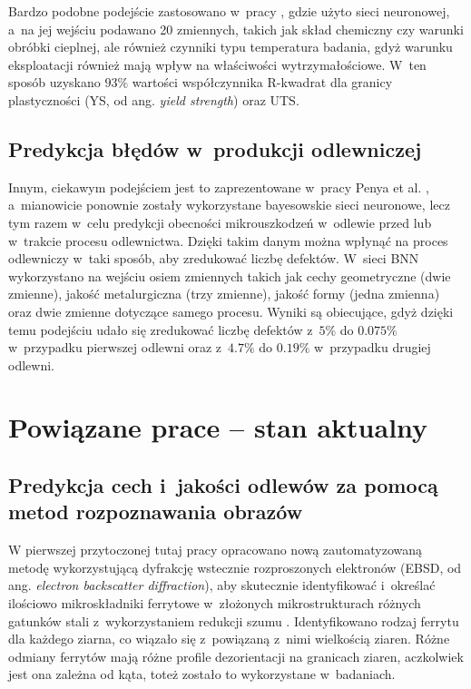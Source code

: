 Bardzo podobne podejście zastosowano w~pracy \cite{Wang20}, gdzie użyto sieci neuronowej, a~na jej wejściu podawano 20 zmiennych, takich jak skład chemiczny czy warunki obróbki cieplnej, ale również czynniki typu temperatura badania, gdyż warunku eksploatacji również mają wpływ na właściwości wytrzymałościowe. W~ten sposób uzyskano $93\%$ wartości współczynnika R-kwadrat dla granicy plastyczności (YS, od ang. \textit{yield strength}) oraz UTS.

\subsection{Predykcja błędów w~produkcji odlewniczej}
\label{sub:predykcja.2}

Innym, ciekawym podejściem jest to zaprezentowane w~pracy Penya et al. \cite{Yoseba08}, a~mianowicie ponownie zostały wykorzystane bayesowskie sieci neuronowe, lecz tym razem w~celu predykcji obecności mikrouszkodzeń w~odlewie przed lub w~trakcie procesu odlewnictwa. Dzięki takim danym można wpłynąć na proces odlewniczy w~taki sposób, aby zredukować liczbę defektów. W~sieci BNN wykorzystano na wejściu osiem zmiennych takich jak cechy geometryczne (dwie zmienne), jakość metalurgiczna (trzy zmienne), jakość formy (jedna zmienna) oraz dwie zmienne dotyczące samego procesu. Wyniki są obiecujące, gdyż dzięki temu podejściu udało się zredukować liczbę defektów z~$5\%$ do $0.075\%$ w~przypadku pierwszej odlewni oraz z~$4.7\%$ do $0.19\%$ w~przypadku drugiej odlewni.

\section{Powiązane prace – stan aktualny}
\label{sec:stan.aktualny}

\subsection{Predykcja cech i~jakości odlewów za pomocą metod rozpoznawania obrazów}
\label{sub:predykcja.3}

W pierwszej przytoczonej tutaj pracy opracowano nową zautomatyzowaną metodę wykorzystującą dyfrakcję wstecznie rozproszonych elektronów (EBSD, od ang. \textit{electron backscatter diffraction}), aby skutecznie identyfikować i~określać ilościowo mikroskładniki ferrytowe w~złożonych mikrostrukturach różnych gatunków stali z~wykorzystaniem redukcji szumu \cite{Shrestha13}. Identyfikowano rodzaj ferrytu dla każdego ziarna, co wiązało się z~powiązaną z~nimi wielkością ziaren. Różne odmiany ferrytów mają różne profile dezorientacji na granicach ziaren, aczkolwiek jest ona zależna od kąta, toteż zostało to wykorzystane w~badaniach.

